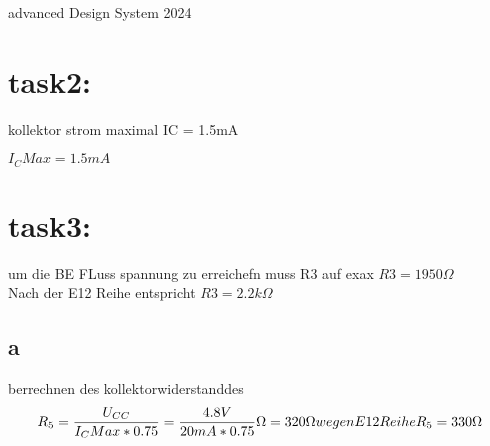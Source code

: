 advanced Design System 2024
\section{task2:}
kollektor strom maximal  IC = 1.5mA

$I_CMax = 1.5mA$

\section{task3:}
um die BE FLuss spannung zu erreichefn
muss R3 auf exax
$R3 = 1950\Omega$\\
Nach der E12 Reihe entspricht $R3 = 2.2k\Omega$
\subsection{a}
berrechnen des kollektorwiderstanddes
\begin{equation}
    R_5 = \frac{U_{CC}}{I_CMax*0.75} = \frac{4.8V}{20mA *0.75}\Omega=320\Omega
    \\wegen E12 Reihe
     R_5 = 330\Omega
\end{equation}

